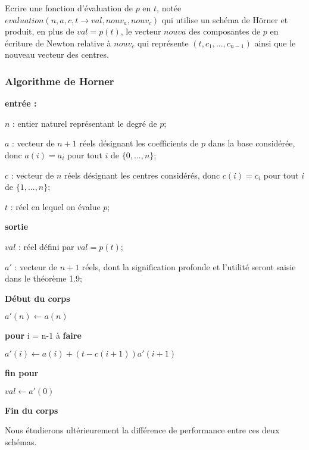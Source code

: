 \documentclass[a4paper,10pt]{report}
\begin{document}
Ecrire une fonction d’évaluation de $p$ en $t$, notée $evaluation(n, a, c, t →
val, nouv_a, nouv_c)$ qui utilise un schéma de Hörner et produit, en plus de
$val = p(t)$, le vecteur $nouv{a}$ des composantes de $p$ en écriture de Newton
relative à $nouv_c$ qui représente $(t, c_{1}, ..., c_{n−1})$ ainsi que le nouveau vecteur des centres.

\subsubsection*{Algorithme de Horner}

\textbf{entrée :}

\begin{list}{}{}
\item $n$ : entier naturel représentant le degré de $p$;
\item $a$ : vecteur de $n+1$ réels désignant les coefficients de $p$ dans la base considérée, donc $a(i) = a_{i}$ pour tout $i$ de $\lbrace 0, ..., n\rbrace$;
\item $c$ : vecteur de $n$ réels désignant les centres considérés, donc $c(i)=c_{i}$ pour tout $i$ de $\lbrace 1, ..., n\rbrace$;
\item $t$ : réel en lequel on évalue $p$;
\end{list}

\textbf{sortie}
\begin{list}{}{}
\item $val$ : réel défini par $val = p(t)$;
\item $a'$ : vecteur de $n+1$ réels, dont la signification profonde et l'utilité seront saisie dans le théorème 1.9;
\end{list}

\textbf{Début du corps}
\begin{list}{}{}
\item $a'(n) \longleftarrow a(n)$
\item \textbf{pour} i = n-1 à \textbf{faire}
\item \begin{list}{}{}
\item $a'(i) \longleftarrow a(i) + (t-c(i+1))a'(i+1)$
\end{list}
\item \textbf{fin pour}
\item $val \longleftarrow a'(0)$
\end{list}

\textbf{Fin du corps}

Nous étudierons ultérieurement la différence de performance entre ces deux schémas. 
\end{document}

